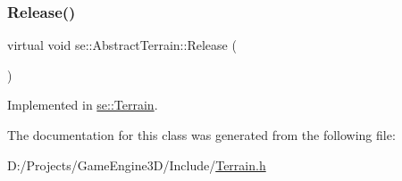 \subsubsection{\texorpdfstring{Release()}{Release()}}
{\footnotesize\ttfamily virtual void se\+::\+Abstract\+Terrain\+::\+Release (\begin{DoxyParamCaption}{ }\end{DoxyParamCaption})\hspace{0.3cm}{\ttfamily [pure virtual]}}



Implemented in \mbox{\hyperlink{classse_1_1_terrain_a61004e3426795d93190fe8d1f4159759}{se\+::\+Terrain}}.



The documentation for this class was generated from the following file\+:\begin{DoxyCompactItemize}
\item 
D\+:/\+Projects/\+Game\+Engine3\+D/\+Include/\mbox{\hyperlink{_terrain_8h}{Terrain.\+h}}\end{DoxyCompactItemize}
